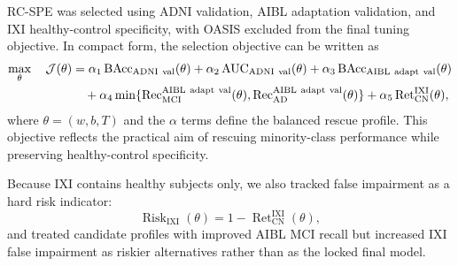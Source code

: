 \documentclass[12pt,a4paper]{article}
\begin{document}
RC-SPE was selected using ADNI validation, AIBL adaptation validation, and IXI healthy-control specificity, with OASIS excluded from the final tuning objective. In compact form, the selection objective can be written as
\begin{align}
\max_{\theta}
\quad
\mathcal{J}(\theta)
&=
\alpha_1 \operatorname{BAcc}_{\mathrm{ADNI\ val}}(\theta)
+ \alpha_2 \operatorname{AUC}_{\mathrm{ADNI\ val}}(\theta)
+ \alpha_3 \operatorname{BAcc}_{\mathrm{AIBL\ adapt\ val}}(\theta) \notag\\
&\quad
+ \alpha_4
\min\{
\operatorname{Rec}^{\mathrm{AIBL\ adapt\ val}}_{\mathrm{MCI}}(\theta),
\operatorname{Rec}^{\mathrm{AIBL\ adapt\ val}}_{\mathrm{AD}}(\theta)
\}
+ \alpha_5
\operatorname{Ret}^{\mathrm{IXI}}_{\mathrm{CN}}(\theta),
\label{eq:selection_objective}
\end{align}
where $\theta=(w,b,T)$ and the $\alpha$ terms define the balanced rescue profile. This objective reflects the practical aim of rescuing minority-class performance while preserving healthy-control specificity.

Because IXI contains healthy subjects only, we also tracked false impairment as a hard risk indicator:
\begin{equation}
\operatorname{Risk}_{\mathrm{IXI}}(\theta)
=
1-\operatorname{Ret}^{\mathrm{IXI}}_{\mathrm{CN}}(\theta),
\label{eq:ixi_risk}
\end{equation}
and treated candidate profiles with improved AIBL MCI recall but increased IXI false impairment as riskier alternatives rather than as the locked final model.

\begin{center}
\end{center}
\end{document}
